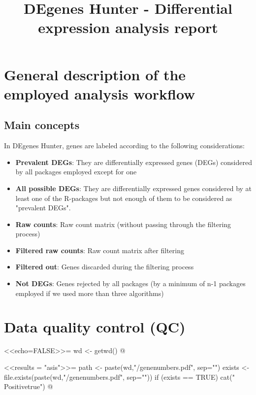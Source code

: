 \documentclass{article}
\begin{document}
\title{DEgenes Hunter - Differential expression analysis report}
	\maketitle


\section{General description of the employed analysis workflow}



\subsection{Main concepts}

In DEgenes Hunter, genes are labeled according to the following considerations:
\begin{itemize}
       \item {\bf Prevalent DEGs}: They are differentially expressed genes (DEGs) considered by all packages employed except for one
       \item {\bf All possible DEGs}: They are differentially expressed genes considered by at least one of the R-packages but not enough of them to be considered as "prevalent DEGs".
       \item {\bf Raw counts}: Raw count matrix (without passing through the filtering process) 
       \item {\bf Filtered raw counts}: Raw count matrix after filtering
       \item {\bf Filtered out}: Genes discarded during the filtering process
       \item {\bf Not DEGs}: Genes rejected by all packages (by a minimum of n-1 packages employed if we used more than three algorithms)
\end{itemize}


\section{Data quality control (QC)}


<<echo=FALSE>>=
wd <- getwd()
@


\newif\ifPositive

<<results = "asis">>=
path <- paste(wd,"/genenumbers.pdf", sep="")
exists <- file.exists(paste(wd,"/genenumbers.pdf", sep=""))
if (exists == TRUE) {
  cat("\\Positivetrue")
}
@
\end{document}
